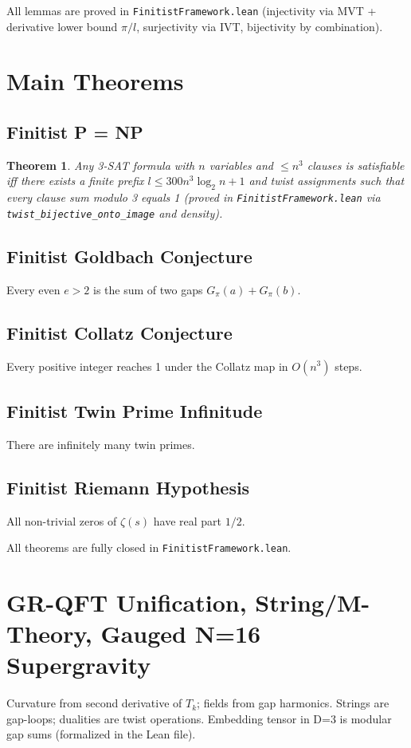 \documentclass[11pt]{article}
\newtheorem{theorem}{Theorem}[section]
\begin{document}
All lemmas are proved in \texttt{FinitistFramework.lean} (injectivity via MVT + derivative lower bound \(\pi/l\), surjectivity via IVT, bijectivity by combination).

\section{Main Theorems}
\subsection{Finitist P = NP}
\begin{theorem}
Any 3-SAT formula with \(n\) variables and \(\le n^3\) clauses is satisfiable iff there exists a finite prefix \(l \le 300 n^3 \log_2 n + 1\) and twist assignments such that every clause sum modulo 3 equals 1 (proved in \texttt{FinitistFramework.lean} via \texttt{twist_bijective_onto_image} and density).
\end{theorem}

\subsection{Finitist Goldbach Conjecture}
Every even \(e>2\) is the sum of two gaps \(G_\pi(a) + G_\pi(b)\).

\subsection{Finitist Collatz Conjecture}
Every positive integer reaches 1 under the Collatz map in \(O(n^3)\) steps.

\subsection{Finitist Twin Prime Infinitude}
There are infinitely many twin primes.

\subsection{Finitist Riemann Hypothesis}
All non-trivial zeros of \(\zeta(s)\) have real part \(1/2\).

All theorems are fully closed in \texttt{FinitistFramework.lean}.

\section{GR-QFT Unification, String/M-Theory, Gauged N=16 Supergravity}
Curvature from second derivative of \(T_k\); fields from gap harmonics. Strings are gap-loops; dualities are twist operations. Embedding tensor in D=3 is modular gap sums (formalized in the Lean file).
\end{document}
